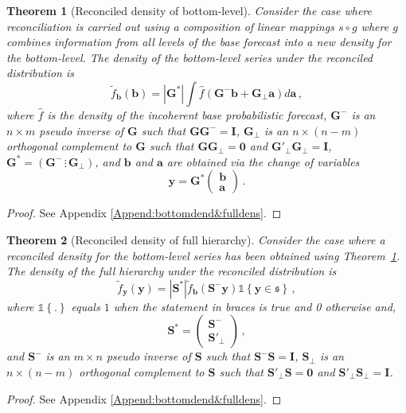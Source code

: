 \documentclass[12pt]{article}
\newtheorem{theo}{Theorem}[section]
\theoremstyle{definition}
\begin{document}
\begin{theo}[Reconciled density of bottom-level]\label{theo:bottomdens}
	Consider the case where reconciliation is carried out using a composition of linear mappings $s\circ g$ where $g$ combines information from all levels of the base forecast into a new density for the bottom-level.  The density of the bottom-level series under the reconciled distribution is
	\[
	\tilde{f}_{\bm{b}}(\bm{b})=|\bm{G^*}|\int \hat{f}(\bm{G}^{-}{\bm b}+\bm{G}_\perp {\bm a})d\bm{a}\,,
	\]
	where $\hat{f}$ is the density of the incoherent base probabilistic forecast, $\bm{G^-}$ is an $n\times m$ pseudo inverse of $\bm{G}$ such that $\bm{G}\bm{G}^-=\bm{I}$, $\bm{G_\perp}$ is an $n\times (n-m)$ orthogonal complement to $\bm{G}$ such that $\bm{G}\bm{G}_\perp=\bm{0}$ and $\bm{G}'_\perp\bm{G}_\perp=\bm{I}$, $\bm{G^*}=\left(\bm{G}^-\,\vdots\,\bm{G}_\perp\right)$, and $\bm{b}$ and $\bm{a}$ are obtained via the change of variables
	\[
	\bm{y}=\bm{G^*}\begin{pmatrix}\bm{b}\\\bm{a}\end{pmatrix}\,.
	\]
\end{theo}

\begin{proof}
	See Appendix \ref{Append:bottomdend&fulldens}.
\end{proof}

\begin{theo}[Reconciled density of full hierarchy]\label{theo:fulldens}
	Consider the case where a reconciled density for the bottom-level series has been obtained using Theorem~\ref{theo:bottomdens}.  The density of the full hierarchy under the reconciled distribution is
	\[
	\tilde{f}_{\bm{y}}(\bm{y})=|\bm{S^*}|\tilde{f}_{\bm b}({\bm{S^-}\bm{y}})\mathbb{1}\left\{\bm{y}\in\mathfrak{s}\right\}\,,
	\]
	where $\mathbb{1}\left\{.\right\}$ equals $1$ when the statement in braces is true and 0 otherwise and,
	\[\bm{S^*}=\begin{pmatrix}\bm{S}^-\\\bm{S}'_\perp\end{pmatrix}\,,\]
	and $\bm{S^-}$ is an $m\times n$ pseudo inverse of $\bm{S}$ such that $\bm{S}^-\bm{S}=\bm{I}$, $\bm{S_\perp}$ is an $n\times (n-m)$ orthogonal complement to $\bm{S}$ such that $\bm{S}'_\perp\bm{S}=\bm{0}$ and $\bm{S}'_\perp\bm{S}_\perp=\bm{I}$.
\end{theo}

\begin{proof}
	See Appendix \ref{Append:bottomdend&fulldens}.
\end{proof}
\end{document}
